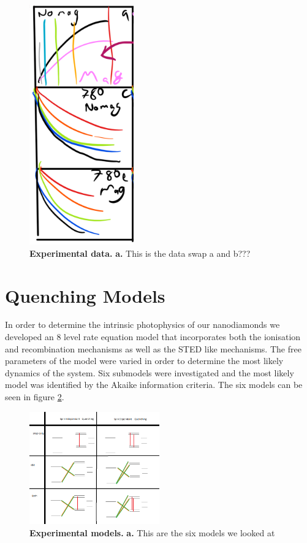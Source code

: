 \documentclass[,prl,twocolumn]{revtex4}
\begin{document}
\begin{figure}[H]
  \centering
  \includegraphics[width=0.4\textwidth]{Data2.png} 
 \caption{\textbf{Experimental data.} \textbf{a.} This is the data swap a and b???} \label{FigData}
\end{figure}




\section{Quenching Models}
In order to determine the intrinsic photophysics of our nanodiamonds we developed an 8 level rate equation model that incorporates both the ionisation and recombination mechanisms as well as the STED like mechanisms. The free parameters of the model were varied in order to determine the most likely dynamics of the system. Six submodels were investigated and the most likely model was identified by the Akaike information criteria. The six models can be seen in figure \ref{FigModels}.

\begin{figure}[H]
  \centering
  \includegraphics[width=0.5\textwidth]{models.png} 
 \caption{\textbf{Experimental models.} \textbf{a.} This are the six models we looked at} \label{FigModels}
\end{figure}
\end{document}
